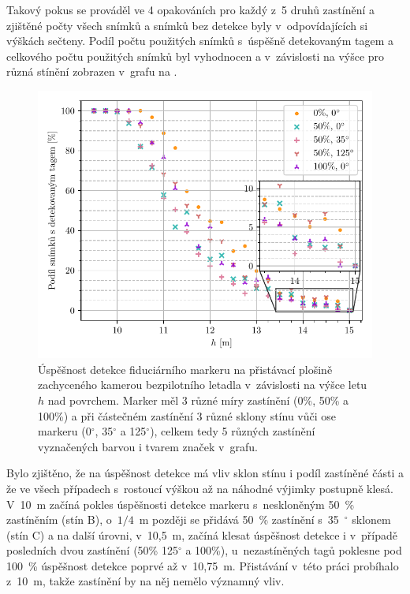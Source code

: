     Takový pokus se prováděl ve 4 opakováních pro každý z~5 druhů zastínění a zjištěné počty všech snímků a snímků bez detekce byly v~odpovídajících si výškách sečteny. Podíl počtu použitých snímků s~úspěšně detekovaným tagem a celkového počtu použitých snímků byl vyhodnocen a v~závislosti na výšce pro různá stínění zobrazen v~grafu na .

    \begin{figure}[H]
      \centering
      \includegraphics{img/results/detekce_stiny.pdf}
      \caption[Úspěšnost detekce zastíněného fiduciárního markeru]{Úspěšnost detekce fiduciárního markeru na přistávací plošině zachyceného kamerou bezpilotního letadla v~závislosti na výšce letu $h$ nad povrchem. Marker měl 3 různé míry zastínění (0\%, 50\% a 100\%) a při částečném zastínění 3 různé sklony stínu vůči ose markeru (0$^\circ$, 35$^\circ$ a 125$^\circ$), celkem tedy 5 různých zastínění vyznačených barvou i tvarem značek v~grafu.}
      \label{fig:detekceStiny}
    \end{figure}

    Bylo zjištěno, že na úspěšnost detekce má vliv sklon stínu i podíl zastíněné části a že ve všech případech s~rostoucí výškou až na náhodné výjimky postupně klesá. V~10~m začíná pokles úspěšnosti detekce markeru s~neskloněným 50~\% zastíněním (stín B), o~$1/4$~m později se přidává 50~\% zastínění s~35~$^\circ$ sklonem (stín C) a na další úrovni, v~10{,}5~m, začíná klesat úspěšnost detekce i v~případě posledních dvou zastínění (50\% 125$^\circ$ a 100\%), u~nezastíněných tagů poklesne pod 100~\% úspěšnost detekce poprvé až v~10{,}75~m. Přistávání v~této práci probíhalo z~10~m, takže zastínění by na něj nemělo významný vliv.


